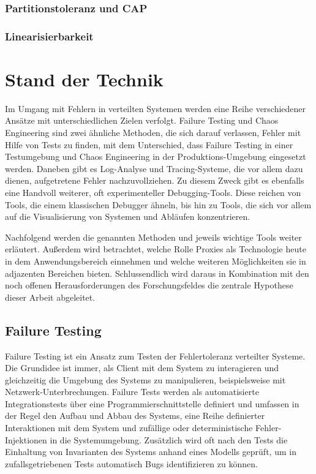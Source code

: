 \documentclass[12pt,a4paper]{report}
\begin{document}
\subsection{Partitionstoleranz und CAP}
\cite{cap_brewer}
\cite{perspectives_on_cap}

\subsection{Linearisierbarkeit}
\cite{linearizability_paper}



\chapter{Stand der Technik}
Im Umgang mit Fehlern in verteilten Systemen werden eine Reihe verschiedener Ansätze mit unterschiedlichen Zielen verfolgt.
Failure Testing und Chaos Engineering sind zwei ähnliche Methoden, die sich darauf verlassen, Fehler mit Hilfe von Tests zu
finden, mit dem Unterschied, dass Failure Testing in einer Testumgebung und Chaos Engineering in der Produktions-Umgebung
eingesetzt werden. Daneben gibt es Log-Analyse und Tracing-Systeme, die vor allem dazu dienen, aufgetretene Fehler
nachzuvollziehen. Zu diesem Zweck gibt es ebenfalls eine Handvoll weiterer, oft experimenteller Debugging-Tools. Diese reichen von
Tools, die einem klassischen Debugger ähneln, bis hin zu Tools, die sich vor allem auf die Visualisierung von Systemen und Abläufen
konzentrieren. \cite{challenges_and_options}

Nachfolgend werden die genannten Methoden und jeweils wichtige Tools weiter erläutert. Außerdem wird betrachtet, welche Rolle
Proxies als Technologie heute in dem Anwendungsbereich einnehmen und welche weiteren Möglichkeiten sie in adjazenten Bereichen
bieten. Schlussendlich wird daraus in Kombination mit den noch offenen Herausforderungen des Forschungsfeldes die zentrale
Hypothese dieser Arbeit abgeleitet.

\section{Failure Testing}
Failure Testing ist ein Ansatz zum Testen der Fehlertoleranz verteilter Systeme. Die Grundidee ist immer, als Client mit dem
System zu interagieren und gleichzeitig die Umgebung des Systems zu manipulieren, beispielsweise mit Netzwerk-Unterbrechungen.
Failure Tests werden als automatisierte Integrationstests über eine Programmierschnittstelle definiert und umfassen in der Regel den Aufbau
und Abbau des Systems, eine Reihe definierter Interaktionen mit dem System und zufällige oder deterministische Fehler-Injektionen
in die Systemumgebung. Zusätzlich wird oft nach den Tests die Einhaltung von Invarianten des Systems anhand eines Modells geprüft, um
in zufallsgetriebenen Tests automatisch Bugs identifizieren zu können. \cite{failify_masters_thesis}
\end{document}
